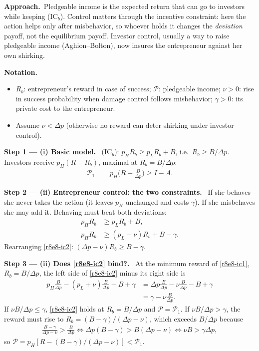 \documentclass[11pt,a4paper]{article}
\newcommand{\notation}{\par\noindent\textbf{Notation.}}
\newcommand{\step}[2]{\par\medskip\noindent\textbf{Step #1 --- #2.}~}
\newcommand{\approach}{\par\smallskip\noindent\textbf{Approach.}~}
\newcommand{\dpp}{\Delta p}
\begin{document}
\approach Pledgeable income is the expected return that can go to investors while keeping (IC$_b$). Control matters through the incentive constraint: here the action helps only after misbehavior, so whoever holds it changes the \emph{deviation} payoff, not the equilibrium payoff. Investor control, usually a way to raise pledgeable income (Aghion--Bolton), now insures the entrepreneur against her own shirking.

\notation
\begin{itemize}
  \item $R_b$: entrepreneur's reward in case of success; $\mathcal P$: pledgeable income; $\nu>0$: rise in success probability when damage control follows misbehavior; $\gamma>0$: its private cost to the entrepreneur.
  \item Assume $\nu<\dpp$ (otherwise no reward can deter shirking under investor control).
\end{itemize}

\step{1}{(i) Basic model} (IC$_b$): $p_HR_b\ge p_LR_b+B$, i.e.\ $R_b\ge B/\dpp$. Investors receive $p_H(R-R_b)$, maximal at $R_b=B/\dpp$:
\begin{align}
  \mathcal P_1 &= p_H\Big(R-\frac{B}{\dpp}\Big) \ge I-A. \label{r8e8-P1}
\end{align}

\step{2}{(ii) Entrepreneur control: the two constraints} If she behaves she never takes the action (it leaves $p_H$ unchanged and costs $\gamma$). If she misbehaves she may add it. Behaving must beat both deviations:
\begin{align}
  p_HR_b &\ge p_LR_b+B, \label{r8e8-ic1}\\
  p_HR_b &\ge (p_L+\nu)R_b+B-\gamma. \label{r8e8-ic2}
\end{align}
Rearranging \eqref{r8e8-ic2}: $(\dpp-\nu)R_b\ge B-\gamma$.

\step{3}{(ii) Does \eqref{r8e8-ic2} bind?} At the minimum reward of \eqref{r8e8-ic1}, $R_b=B/\dpp$, the left side of \eqref{r8e8-ic2} minus its right side is
\begin{align}
  p_H\frac{B}{\dpp}-(p_L+\nu)\frac{B}{\dpp}-B+\gamma &= \dpp\frac{B}{\dpp}-\nu\frac{B}{\dpp}-B+\gamma \nonumber\\
  &= \gamma-\nu\frac{B}{\dpp}. \label{r8e8-slack}
\end{align}
If $\nu B/\dpp\le\gamma$, \eqref{r8e8-ic2} holds at $R_b=B/\dpp$ and $\mathcal P=\mathcal P_1$. If $\nu B/\dpp>\gamma$, the reward must rise to $R_b=(B-\gamma)/(\dpp-\nu)$, which exceeds $B/\dpp$ because
\begin{align}
  \frac{B-\gamma}{\dpp-\nu}>\frac{B}{\dpp} \iff \dpp(B-\gamma)>B(\dpp-\nu) \iff \nu B>\gamma\dpp, \nonumber
\end{align}
so $\mathcal P=p_H[R-(B-\gamma)/(\dpp-\nu)]<\mathcal P_1$.
\end{document}
